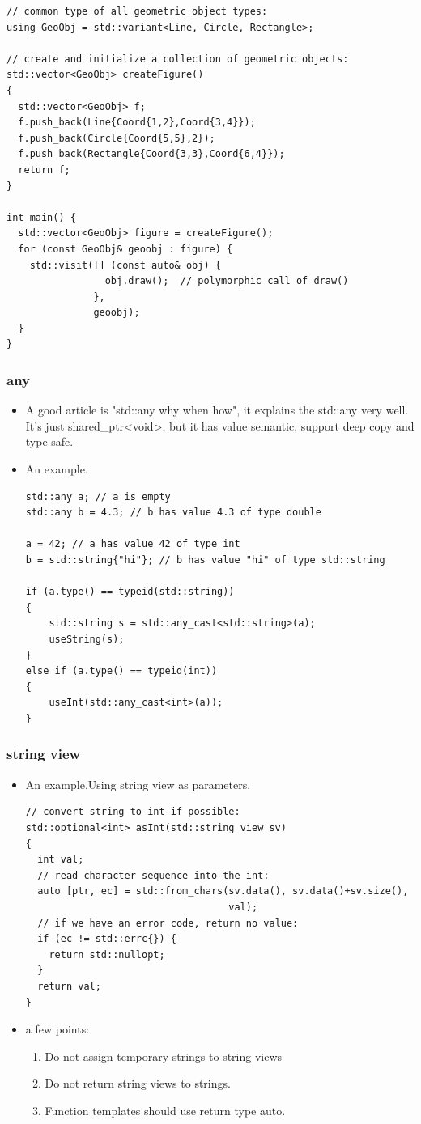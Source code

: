 \documentclass[a4paper,11pt,twoside]{book}
\begin{document}
\begin{itemize}
\begin{lstlisting}
// common type of all geometric object types:
using GeoObj = std::variant<Line, Circle, Rectangle>;
  
// create and initialize a collection of geometric objects:
std::vector<GeoObj> createFigure()
{
  std::vector<GeoObj> f;
  f.push_back(Line{Coord{1,2},Coord{3,4}});
  f.push_back(Circle{Coord{5,5},2});  
  f.push_back(Rectangle{Coord{3,3},Coord{6,4}});  
  return f;
}

int main() {
  std::vector<GeoObj> figure = createFigure();
  for (const GeoObj& geoobj : figure) {
    std::visit([] (const auto& obj) {
                 obj.draw();  // polymorphic call of draw()
               },
               geoobj);
  }
}
\end{lstlisting}
\end{itemize}

\subsubsection{any}
\begin{itemize}
		\item A good article is "std::any why when how", it explains the std::any very well. It's just shared\_ptr<void>, but it has value semantic, support deep copy and type safe. 
		\item An example.
\begin{lstlisting}
std::any a; // a is empty
std::any b = 4.3; // b has value 4.3 of type double
 
a = 42; // a has value 42 of type int
b = std::string{"hi"}; // b has value "hi" of type std::string
 
if (a.type() == typeid(std::string)) 
{
    std::string s = std::any_cast<std::string>(a);
    useString(s);
}
else if (a.type() == typeid(int)) 
{
    useInt(std::any_cast<int>(a));
}
\end{lstlisting}
\end{itemize}
\subsubsection{string view}
\begin{itemize}
\item An example.Using string view as parameters.
\begin{lstlisting}
// convert string to int if possible:
std::optional<int> asInt(std::string_view sv)
{
  int val;
  // read character sequence into the int:
  auto [ptr, ec] = std::from_chars(sv.data(), sv.data()+sv.size(),
                                   val);
  // if we have an error code, return no value:
  if (ec != std::errc{}) {
    return std::nullopt;
  }
  return val;
}
\end{lstlisting}
\item a few points:
\begin{enumerate}
		\item Do not assign temporary strings to string views
		\item Do not return string views to strings.
		\item Function templates should use return type auto. 
\end{enumerate}
\end{itemize}
\end{document}
